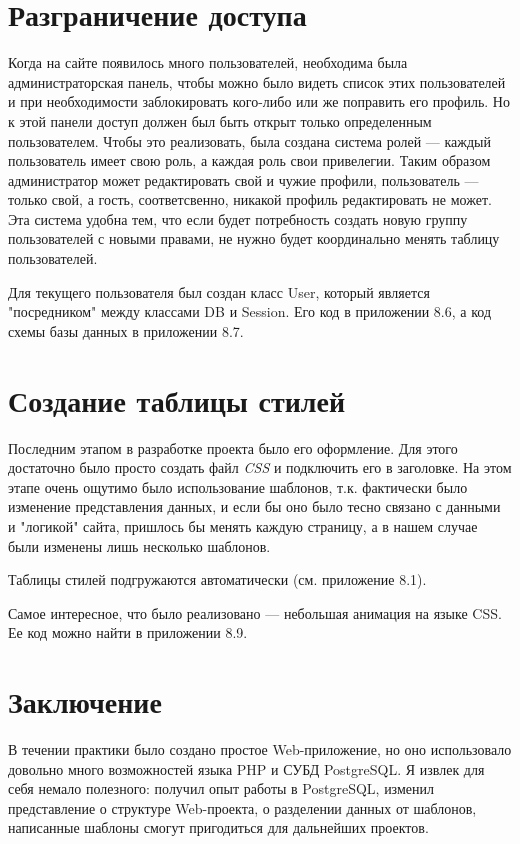 \documentclass[a4paper]{article}
\begin{document}
\section{Разграничение доступа}
Когда на сайте появилось много пользователей, необходима была администраторская панель, чтобы можно было видеть список этих пользователей и при необходимости заблокировать кого-либо или же поправить его профиль. Но к этой панели доступ должен был быть открыт только определенным пользователем. Чтобы это реализовать, была создана система ролей --- каждый пользователь имеет свою роль, а каждая роль свои привелегии. Таким образом администратор может редактировать свой и чужие профили, пользователь --- только свой, а гость, соответсвенно, никакой профиль редактировать не может. Эта система удобна тем, что если будет потребность создать новую группу пользователей с новыми правами, не нужно будет координально менять таблицу пользователей.

Для текущего пользователя был создан класс User, который является "посредником" между классами DB и Session. Его код в приложении 8.6, а код схемы базы данных в приложении 8.7.

\section{Создание таблицы стилей}
Последним этапом в разработке проекта было его оформление. Для этого достаточно было просто создать файл \textit{CSS} и подключить его в заголовке. На этом этапе очень ощутимо было использование шаблонов, т.к. фактически было изменение представления данных, и если бы оно было тесно связано с данными и "логикой" сайта, пришлось бы менять каждую страницу, а в нашем случае были изменены лишь несколько шаблонов.

Таблицы стилей подгружаются автоматически (см. приложение 8.1).

Самое интересное, что было реализовано --- небольшая анимация на языке CSS. Ее код можно найти в приложении 8.9.

\section{Заключение}
В течении практики было создано простое Web-приложение, но оно использовало довольно много возможностей языка PHP и СУБД PostgreSQL. Я извлек для себя немало полезного: получил опыт работы в PostgreSQL, изменил представление о структуре Web-проекта, о разделении данных от шаблонов, написанные шаблоны смогут пригодиться для дальнейших проектов.
\end{document}
